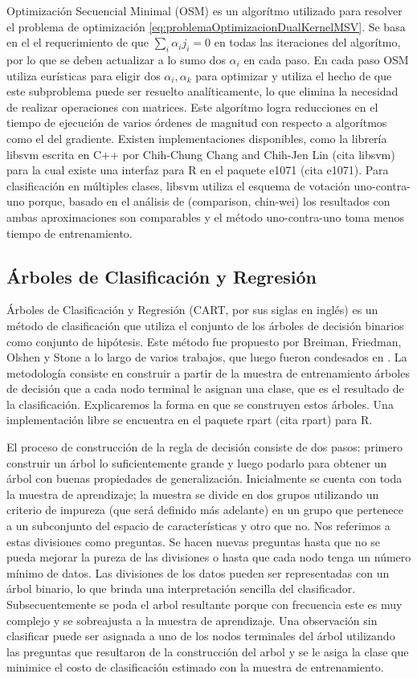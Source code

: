 \documentclass[letterpaper,12pt]{book}
\begin{document}
Optimización Secuencial Minimal (OSM) es un algorítmo utilizado para resolver el problema de optimización \ref{eq:problemaOptimizacionDualKernelMSV}. Se basa en el el requerimiento de que $\sum_i\alpha_ij_i = 0$ en todas las iteraciones del algorítmo, por lo que se deben actualizar a lo sumo dos $\alpha_i$ en cada paso. En cada paso OSM utiliza eurísticas para eligir dos $\alpha_i, \alpha_k$ para optimizar y utiliza el hecho de que este subproblema puede ser resuelto analíticamente, lo que elimina la necesidad de realizar operaciones con matrices. Este algorítmo logra reducciones en el tiempo de ejecución de varios órdenes de magnitud con respecto a algorítmos como el del gradiente. Existen implementaciones disponibles, como la librería libsvm escrita en C++ por Chih-Chung Chang and Chih-Jen Lin (cita libsvm) para la cual existe una interfaz para R en el paquete e1071 (cita e1071). Para clasificación en múltiples clases, libsvm utiliza el esquema de votación uno-contra-uno porque, basado en el análisis de (comparison, chin-wei) los resultados con ambas aproximaciones son comparables y el método uno-contra-uno toma menos tiempo de entrenamiento.

\subsection{Árboles de Clasificación y Regresión}

Árboles de Clasificación y Regresión (CART, por sus siglas en inglés) es un método de clasificación que utiliza el conjunto de los árboles de decisión binarios como conjunto de hipótesis. Este método fue propuesto por Breiman, Friedman, Olshen y Stone a lo largo de varios trabajos, que luego fueron condesados en \cite{breiman_classification_1984}. La metodología consiste en construir a partir de la muestra de entrenamiento árboles de decisión que a cada nodo terminal le asignan una clase, que es el resultado de la clasificación. Explicaremos la forma en que se construyen estos árboles. Una implementación libre se encuentra en el paquete rpart (cita rpart) para R.

El proceso de construcción de la regla de decisión consiste de dos pasos: primero construir un árbol lo suficientemente grande y luego podarlo para obtener un árbol con buenas propiedades de generalización. Inicialmente se cuenta con toda la muestra de aprendizaje; la muestra se divide en dos grupos utilizando un criterio de impureza (que será definido más adelante) en un grupo que pertenece a un subconjunto del espacio de características y otro que no. Nos referimos a estas divisiones como preguntas. Se hacen nuevas preguntas hasta que no se pueda mejorar  la pureza de las divisiones o hasta que cada nodo tenga un número mínimo de datos. Las divisiones de los datos pueden ser representadas con un árbol binario, lo que brinda una interpretación sencilla del clasificador. Subsecuentemente se poda el arbol resultante porque con frecuencia este es muy complejo y se sobreajusta a la muestra de aprendizaje. Una observación sin clasificar puede ser asignada  a uno de los nodos terminales del árbol utilizando las preguntas que resultaron de la construcción del arbol y se le asiga la clase que minimice el costo de clasificación estimado con la muestra de entrenamiento.  
\end{document}

